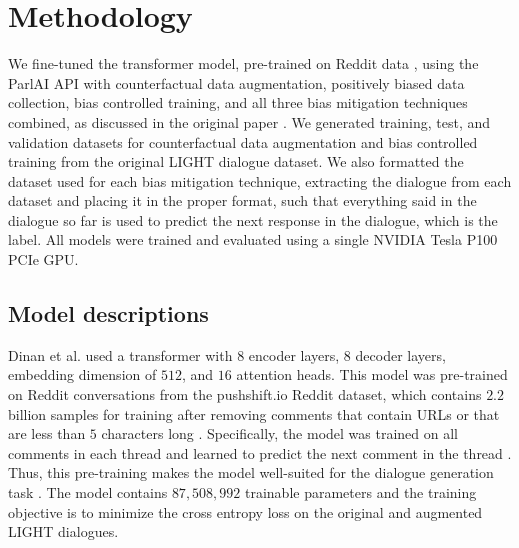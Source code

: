 
\section{Methodology}
We fine-tuned the transformer model, pre-trained on Reddit data \supercite{redditmodel}, using the ParlAI API \supercite{miller2018} with counterfactual data augmentation, positively biased data collection, bias controlled training, and all three bias mitigation techniques combined, as discussed in the original paper \supercite{dinan2020}. We generated training, test, and validation datasets for counterfactual data augmentation and bias controlled training from the original LIGHT dialogue dataset. We also formatted the dataset used for each bias mitigation technique, extracting the dialogue from each dataset and placing it in the proper format, such that everything said in the dialogue so far is used to predict the next response in the dialogue, which is the label. All models were trained and evaluated using a single NVIDIA Tesla P100 PCIe GPU.

\subsection{Model descriptions}
Dinan et al. \supercite{dinan2020} used a transformer with $8$ encoder layers, $8$ decoder layers, embedding dimension of $512$, and $16$ attention heads. This model was pre-trained on Reddit conversations from the pushshift.io Reddit dataset, which contains $2.2$ billion samples for training after removing comments that contain URLs or that are less than $5$ characters long \supercite{dinan2020}. Specifically, the model was trained on all comments in each thread and learned to predict the next comment in the thread \supercite{dinan2020}. Thus, this pre-training makes the model well-suited for the dialogue generation task \supercite{redditmodel}. The model contains $87,508,992$ trainable parameters and the training objective is to minimize the cross entropy loss on the original and augmented LIGHT dialogues.

